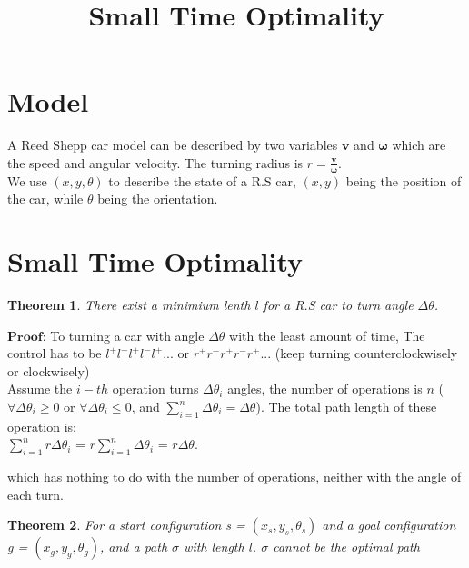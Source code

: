 \documentclass[12pt]{article}
\title{Small Time Optimality}
\date{}
\newtheorem{theorem}{Theorem}[section]
\begin{document}
  \maketitle
  \section{Model}
	A Reed Shepp car model can be described by two variables $\boldsymbol{v}$ and $\boldsymbol{\omega}$ which are the speed and angular velocity. The turning radius is $r=\frac{ \boldsymbol{v} }{ \boldsymbol{\omega} }$.\\
	
	We use $(x,y,\theta)$ to describe the state of a R.S car, $(x,y)$ being the position of the car, while $\theta$ being the orientation.
  
  \section{Small Time Optimality}
  \begin{theorem}
  	There exist a minimium lenth $l$ for a R.S car to turn angle $\Delta\theta$. 
  \end{theorem}
  
  $\textbf{Proof}$: To turning a car with angle $\Delta\theta$ with the least amount of time, The control has to be $l^{+}l^{-}l^{+}l^{-}l^{+}...$ or $r^{+}r^{-}r^{+}r^{-}r^{+}...$ (keep turning counterclockwisely or clockwisely)\\ 
  
  Assume the $i-th$ operation turns $\Delta\theta_{i}$ angles, the number of operations is $n$ ($\forall{\Delta\theta_{i}} \geq 0$ or $\forall{\Delta\theta_{i}} \leq 0$, and $\sum_{i=1}^{n}\Delta\theta_{i} = \Delta\theta$). The total path length of these operation is:\\
  
  $\sum_{i=1}^{n}r\Delta\theta_{i}$ = $r\sum_{i=1}^{n}\Delta\theta_{i}$ = $r\Delta\theta$.

  which has nothing to do with the number of operations, neither with the angle of each turn.  
  
  \begin{theorem}
  	For a start configuration s = $(x_{s},y_{s},\theta_{s})$ and a goal configuration g = $(x_{g},y_{g},\theta_{g})$, and a path $\sigma$ with length $l$. $\sigma$ cannot be the optimal path 
  \end{theorem} 
  
\end{document}
